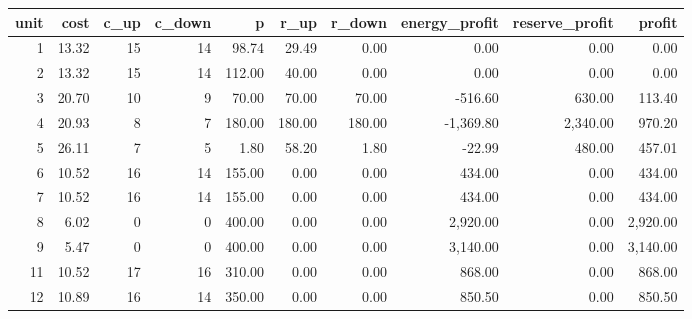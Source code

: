 \begin{tabular}{rrrrrrrrrr}
\toprule
unit & cost & c\_up & c\_down & p & r\_up & r\_down & energy\_profit & reserve\_profit & profit \\
\midrule
1 & 13.32 & 15 & 14 & 98.74 & 29.49 & 0.00 & 0.00 & 0.00 & 0.00 \\
2 & 13.32 & 15 & 14 & 112.00 & 40.00 & 0.00 & 0.00 & 0.00 & 0.00 \\
3 & 20.70 & 10 & 9 & 70.00 & 70.00 & 70.00 & -516.60 & 630.00 & 113.40 \\
4 & 20.93 & 8 & 7 & 180.00 & 180.00 & 180.00 & -1,369.80 & 2,340.00 & 970.20 \\
5 & 26.11 & 7 & 5 & 1.80 & 58.20 & 1.80 & -22.99 & 480.00 & 457.01 \\
6 & 10.52 & 16 & 14 & 155.00 & 0.00 & 0.00 & 434.00 & 0.00 & 434.00 \\
7 & 10.52 & 16 & 14 & 155.00 & 0.00 & 0.00 & 434.00 & 0.00 & 434.00 \\
8 & 6.02 & 0 & 0 & 400.00 & 0.00 & 0.00 & 2,920.00 & 0.00 & 2,920.00 \\
9 & 5.47 & 0 & 0 & 400.00 & 0.00 & 0.00 & 3,140.00 & 0.00 & 3,140.00 \\
11 & 10.52 & 17 & 16 & 310.00 & 0.00 & 0.00 & 868.00 & 0.00 & 868.00 \\
12 & 10.89 & 16 & 14 & 350.00 & 0.00 & 0.00 & 850.50 & 0.00 & 850.50 \\
\bottomrule
\end{tabular}
